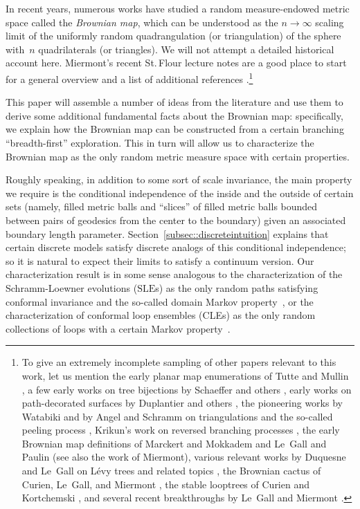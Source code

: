 \documentclass[JEP,XML,SOM,Unicode]{cedram}
\theoremstyle{plain}
\numberwithin{theorem}{section}
\theoremstyle{definition}
\newcommand{\SLE}{\mathrm{SLE}}
\begin{document}
In recent years, numerous works have studied a random measure-endowed metric space called the \emph{Brownian map}, which can be understood as the $n \to \infty$ scaling limit of the uniformly random quadrangulation (or triangulation) of the sphere with~$n$ quadrilaterals (or triangles). We will not attempt a detailed historical account here. Miermont's recent St.\,Flour lecture notes are a good place to start for a general overview and a list of additional references \cite{miermontstflour}.\footnote{To give an extremely incomplete sampling of other papers relevant to this work, let us mention the early planar map enumerations of Tutte and Mullin \cite{tutte1962census,mullintrees,MR0218276}, a few early works on tree bijections by Schaeffer and others \cite{cori1981planar, jacquardschaeffer, schaeffermaps, bousquetmelouschaeffer, chassaingschaeffer}, early works on path-decorated surfaces by Duplantier and others \cite{dk1998rwks, ds1989fk, dup1998rw_qg}, the pioneering works by Watabiki and by Angel and Schramm on triangulations and the so-called peeling process \cite{watabikipeeling, angelUIPTpercolation, angelschrammUIPT}, Krikun's work on reversed branching processes \cite{krikun2005uniform}, the early Brownian map definitions of Marckert and Mokkadem \cite{marckert2006limit} and Le~Gall and Paulin \cite{le2008scaling} (see also the work \cite{MR2399286} of Miermont), various relevant works by Duquesne and Le~Gall on Lévy trees and related topics \cite{dlg2002trees_levy, duquesnelegall2005levytrees,duquesnelegallhausdorff, duquesnelegallrerooting}, the Brownian cactus of Curien, Le~Gall, and Miermont \cite{browniancactus}, the stable looptrees of Curien and Kortchemski \cite{ck2013looptrees}, and several recent breakthroughs by Le~Gall and Miermont \cite{legallgeodesics, legalluniqueanduniversal, miermontlimit, legalluniversallimit}.}

This paper will assemble a number of ideas from the literature and use them to derive some additional fundamental facts about the Brownian map: specifically, we explain how the Brownian map can be constructed from a certain branching ``breadth-first'' exploration. This in turn will allow us to characterize the Brownian map as the only random metric measure space with certain properties.\enlargethispage{\baselineskip}%

Roughly speaking, in addition to some sort of scale invariance, the main property we require is the conditional independence of the inside and the outside of certain sets (namely, filled metric balls and ``slices'' of filled metric balls bounded between pairs of geodesics from the center to the boundary) given an associated boundary length parameter. Section~\ref{subsec::discreteintuition} explains that certain discrete models satisfy discrete analogs of this conditional independence; so it is natural to expect their limits to satisfy a continuum version. Our characterization result is in some sense analogous to the characterization of the Schramm-Loewner evolutions ($\SLE$s) as the only random paths satisfying conformal invariance and the so-called domain Markov property~\cite{S0}, or the characterization of conformal loop ensembles (CLEs) as the only random collections of loops with a certain Markov property~\cite{MR2979861}.
\end{document}
